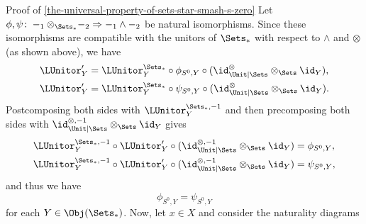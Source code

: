 \begin{Proof}{Proof of \cref{the-universal-property-of-sets-star-smash-s-zero}}
    Let $\phi,\psi\colon-_{1}\otimes_{\Sets_{*}}-_{2}\Rightarrow-_{1}\wedge-_{2}$ be natural isomorphisms. Since these isomorphisms are compatible with the unitors of $\Sets_{*}$ with respect to $\wedge$ and $\otimes$ (as shown above), we have
    \begin{align*}
        \LUnitor'_{Y} &= \LUnitor^{\Sets_{*}}_{Y}\circ\phi_{S^{0},Y}\circ(\id^{\otimes}_{\Unit|\Sets}\otimes_{\Sets}\id_{Y}),\\
        \LUnitor'_{Y} &= \LUnitor^{\Sets_{*}}_{Y}\circ\psi_{S^{0},Y}\circ(\id^{\otimes}_{\Unit|\Sets}\otimes_{\Sets}\id_{Y}).
    \end{align*}
    Postcomposing both sides with $\LUnitor^{\Sets_{*},-1}_{Y}$ and then precomposing both sides with $\id^{\otimes,-1}_{\Unit|\Sets}\otimes_{\Sets}\id_{Y}$ gives
    \begin{align*}
        \LUnitor^{\Sets_{*},-1}_{Y}\circ\LUnitor'_{Y}\circ(\id^{\otimes,-1}_{\Unit|\Sets}\otimes_{\Sets}\id_{Y}) &= \phi_{S^{0},Y},\\
        \LUnitor^{\Sets_{*},-1}_{Y}\circ\LUnitor'_{Y}\circ(\id^{\otimes,-1}_{\Unit|\Sets}\otimes_{\Sets}\id_{Y}) &= \psi_{S^{0},Y},
    \end{align*}
    and thus we have
    \[
        \phi_{S^{0},Y}%
        =%
        \psi_{S^{0},Y}%
    \]%
    for each $Y\in\Obj(\Sets_{*})$. Now, let $x\in X$ and consider the naturality diagrams
    \begin{webcompile}
        \quad
\end{webcompile}
\end{Proof}
